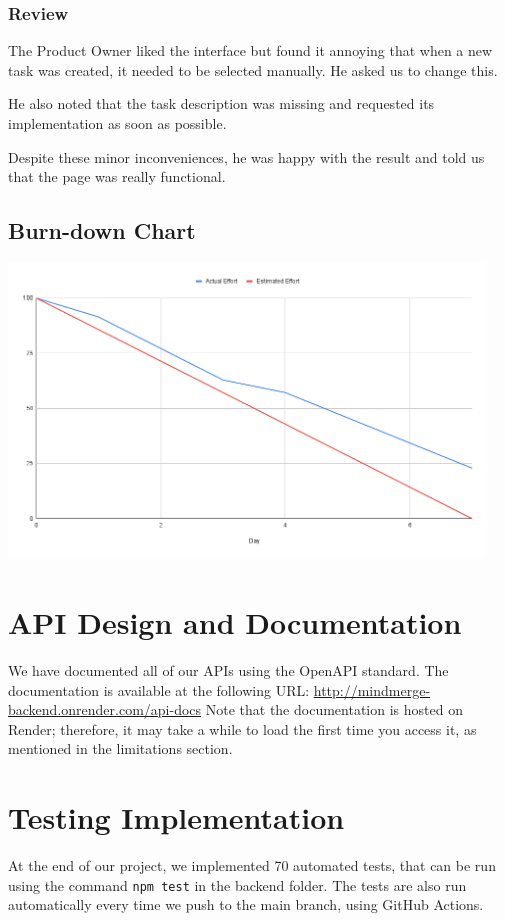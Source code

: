 \documentclass{article}
\begin{document}
\subsubsection{Review}
The Product Owner liked the interface but found it annoying that when a new task was created, it needed to be selected manually. He asked us to change this.

He also noted that the task description was missing and requested its implementation as soon as possible.

Despite these minor inconveniences, he was happy with the result and told us that the page was really functional.
\subsection{Burn-down Chart}
\includegraphics[width=0.95\textwidth]{images/burndown_chart_3.png}

\section{API Design and Documentation}
We have documented all of our APIs using the OpenAPI standard. The documentation is available at the following URL: \url{http://mindmerge-backend.onrender.com/api-docs}
\newline
Note that the documentation is hosted on Render; therefore, it may take a while to load the first time you access it, as mentioned in the limitations section.

\section{Testing Implementation}

At the end of our project, we implemented 70 automated tests, that can be run using the command \texttt{npm test}
in the backend folder.
\newline
The tests are also run automatically every time we push to the main branch, using GitHub Actions.
\end{document}
